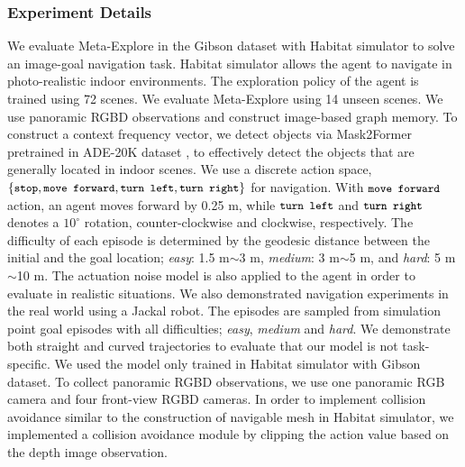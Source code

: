 \documentclass[10pt,twocolumn,letterpaper]{article}
\begin{document}
\subsubsection{Experiment Details}
We evaluate Meta-Explore in the Gibson dataset \cite{xia2018gibson} with Habitat \cite{szot2021habitat} simulator to solve an image-goal navigation task. Habitat simulator allows the agent to navigate in photo-realistic indoor environments. The exploration policy of the agent is trained using 72 scenes. We evaluate Meta-Explore using 14 unseen scenes. We use panoramic RGBD observations and construct image-based graph memory. To construct a context frequency vector, we detect objects via Mask2Former \cite{cheng2021mask2former} pretrained in ADE-20K dataset \cite{zhou2017scene}, to effectively detect the objects that are generally located in indoor scenes. We use a discrete action space, $\small\{\texttt{stop}, \texttt{move forward}, \texttt{turn left}, \texttt{turn right}\}$ for navigation. With $\small\texttt{move forward}$ action, an agent moves forward by 0.25 m, while $\small\texttt{turn left}$ and $\small\texttt{turn right}$ denotes a ${10}^{\circ}$ rotation, counter-clockwise and clockwise, respectively. The difficulty of each episode is determined by the geodesic distance between the initial and the goal location; \textit{easy}: 1.5 m$\sim$3 m, \textit{medium}: 3 m$\sim$5 m, and \textit{hard}: 5 m$\sim$10 m. The actuation noise model \cite{chaplot2020Learning} is also applied to the agent in order to evaluate in realistic situations. We also demonstrated navigation experiments in the real world using a Jackal robot. The episodes are sampled from simulation point goal episodes with all difficulties; \textit{easy}, \textit{medium} and \textit{hard}. We demonstrate both straight and curved trajectories to evaluate that our model is not task-specific. We used the model only trained in Habitat simulator with Gibson dataset. To collect panoramic RGBD observations, we use one panoramic RGB camera and four front-view RGBD cameras. In order to implement collision avoidance similar to the construction of navigable mesh in Habitat simulator, we implemented a collision avoidance module by clipping the action value based on the depth image observation.
\end{document}
